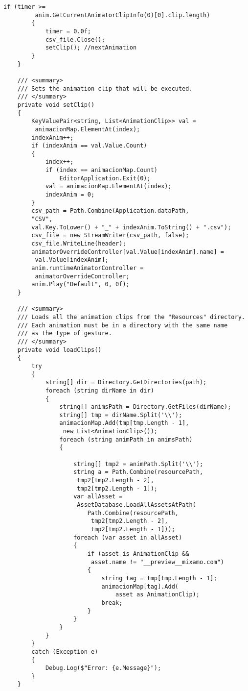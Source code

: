 \begin{lstlisting}[style=customcsharp, caption={Código de la herramienta MixamoDumper}, label={lst:MixamoDumperCode}]
        if (timer >= 
         anim.GetCurrentAnimatorClipInfo(0)[0].clip.length)
        {
            timer = 0.0f;
            csv_file.Close();
            setClip(); //nextAnimation
        }
    }

    /// <summary>
    /// Sets the animation clip that will be executed.
    /// </summary>
    private void setClip()
    {
        KeyValuePair<string, List<AnimationClip>> val = 
         animacionMap.ElementAt(index);
        indexAnim++;
        if (indexAnim == val.Value.Count)
        {
            index++;
            if (index == animacionMap.Count)
                EditorApplication.Exit(0);
            val = animacionMap.ElementAt(index);
            indexAnim = 0;
        }
        csv_path = Path.Combine(Application.dataPath, 
        "CSV", 
        val.Key.ToLower() + "_" + indexAnim.ToString() + ".csv");
        csv_file = new StreamWriter(csv_path, false);
        csv_file.WriteLine(header);
        animatorOverrideController[val.Value[indexAnim].name] = 
         val.Value[indexAnim];
        anim.runtimeAnimatorController = 
         animatorOverrideController;
        anim.Play("Default", 0, 0f);
    }

    /// <summary>
    /// Loads all the animation clips from the "Resources" directory.
    /// Each animation must be in a directory with the same name 
    /// as the type of gesture.
    /// </summary>
    private void loadClips()
    {
        try
        {
            string[] dir = Directory.GetDirectories(path);
            foreach (string dirName in dir)
            {
                string[] animsPath = Directory.GetFiles(dirName);
                string[] tmp = dirName.Split('\\');
                animacionMap.Add(tmp[tmp.Length - 1], 
                 new List<AnimationClip>());
                foreach (string animPath in animsPath)
                {

                    string[] tmp2 = animPath.Split('\\');
                    string a = Path.Combine(resourcePath, 
                     tmp2[tmp2.Length - 2], 
                     tmp2[tmp2.Length - 1]);
                    var allAsset = 
                     AssetDatabase.LoadAllAssetsAtPath(
                        Path.Combine(resourcePath, 
                         tmp2[tmp2.Length - 2], 
                         tmp2[tmp2.Length - 1]));
                    foreach (var asset in allAsset)
                    {
                        if (asset is AnimationClip && 
                         asset.name != "__preview__mixamo.com")
                        {
                            string tag = tmp[tmp.Length - 1];
                            animacionMap[tag].Add(
                                asset as AnimationClip);
                            break;
                        }
                    }
                }
            }
        }
        catch (Exception e)
        {
            Debug.Log($"Error: {e.Message}");
        }
    }


\end{lstlisting}

